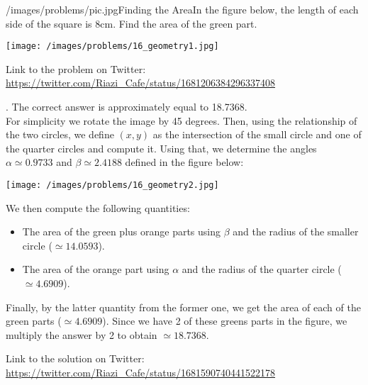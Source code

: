 \begin{problem}{/images/problems/pic.jpg}{Finding the Area}In the figure below, the length of each side of the square is 8cm. Find the area of the green part.

\begin{center}
	\texttt{[image: /images/problems/16\_geometry1.jpg]}
\end{center}

Link to the problem on Twitter: \url{https://twitter.com/Riazi_Cafe/status/1681206384296337408}
\end{problem}
\begin{solution}.
The correct answer is approximately equal to 18.7368.\\[0.2cm]

For simplicity we rotate the image by 45 degrees. Then, using the relationship of the two circles, we define $(x,y)$ as the intersection of the small circle and one of the quarter circles and compute it. Using that, we determine the angles $\alpha \simeq 0.9733$ and $\beta \simeq 2.4188$ defined in the figure below:

\begin{center}
	\texttt{[image: /images/problems/16\_geometry2.jpg]}
\end{center}

We then compute the following quantities:
\begin{itemize}
\item The area of the green plus orange parts using $\beta$ and the radius of the smaller circle ($\simeq 14.0593$).
\item The area of the orange part using $\alpha$ and the radius of the quarter circle ($\simeq 4.6909$).
\end{itemize}
Finally, by the latter quantity from the former one, we get the area of each of the green parts ($\simeq 4.6909$). Since we have 2 of these greens parts in the figure, we multiply the answer by 2 to obtain $\simeq 18.7368$.


Link to the solution on Twitter:  \url{https://twitter.com/Riazi_Cafe/status/1681590740441522178}\end{solution}
